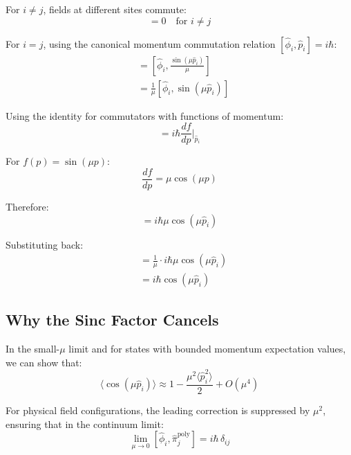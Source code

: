 \documentclass[12pt]{article}
\begin{document}
For $i \neq j$, fields at different sites commute:
\begin{equation}
[\hat{\phi}_i, \hat{\pi}_j^{\text{poly}}] = 0 \quad \text{for } i \neq j
\end{equation}

For $i = j$, using the canonical momentum commutation relation $[\hat{\phi}_i, \hat{p}_i] = i\hbar$:
\begin{align}
[\hat{\phi}_i, \hat{\pi}_i^{\text{poly}}] &= [\hat{\phi}_i, \frac{\sin(\mu \hat{p}_i)}{\mu}] \\
&= \frac{1}{\mu}[\hat{\phi}_i, \sin(\mu \hat{p}_i)]
\end{align}

Using the identity for commutators with functions of momentum:
\begin{equation}
[\hat{\phi}_i, f(\hat{p}_i)] = i\hbar \frac{df}{dp}\bigg|_{\hat{p}_i}
\end{equation}

For $f(p) = \sin(\mu p)$:
\begin{equation}
\frac{df}{dp} = \mu \cos(\mu p)
\end{equation}

Therefore:
\begin{equation}
[\hat{\phi}_i, \sin(\mu \hat{p}_i)] = i\hbar \mu \cos(\mu \hat{p}_i)
\end{equation}

Substituting back:
\begin{align}
[\hat{\phi}_i, \hat{\pi}_i^{\text{poly}}] &= \frac{1}{\mu} \cdot i\hbar \mu \cos(\mu \hat{p}_i) \\
&= i\hbar \cos(\mu \hat{p}_i)
\end{align}

\subsection{Why the Sinc Factor Cancels}

In the small-$\mu$ limit and for states with bounded momentum expectation values, we can show that:
\begin{equation}
\langle \cos(\mu \hat{p}_i) \rangle \approx 1 - \frac{\mu^2 \langle \hat{p}_i^2 \rangle}{2} + O(\mu^4)
\end{equation}

For physical field configurations, the leading correction is suppressed by $\mu^2$, ensuring that in the continuum limit:
\begin{equation}
\lim_{\mu \to 0} [\hat{\phi}_i, \hat{\pi}_j^{\text{poly}}] = i\hbar\,\delta_{ij}
\end{equation}
\end{document}
